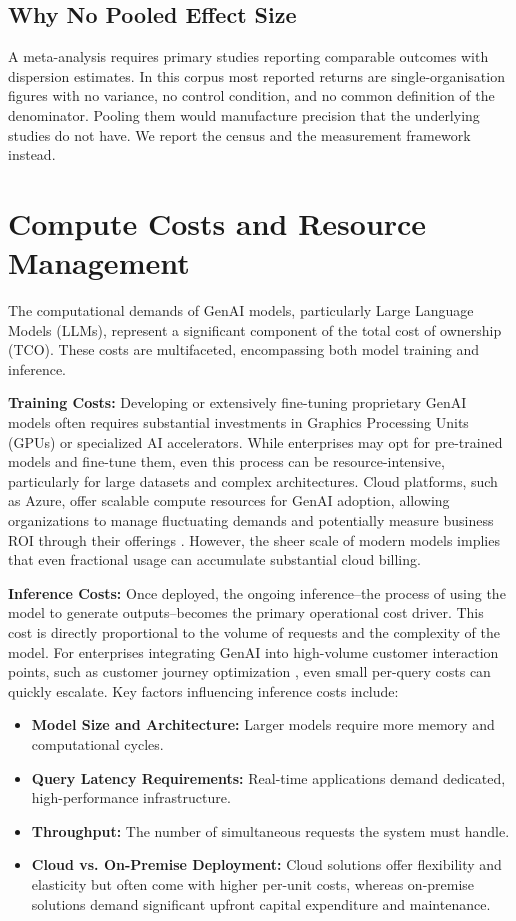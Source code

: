 \documentclass{article}
\begin{document}
\subsection{Why No Pooled Effect Size}


A meta-analysis requires primary studies reporting comparable outcomes with dispersion estimates. In this corpus most reported returns are single-organisation figures with no variance, no control condition, and no common definition of the denominator. Pooling them would manufacture precision that the underlying studies do not have. We report the census and the measurement framework instead.



\section{Compute Costs and Resource Management}


The computational demands of GenAI models, particularly Large Language Models (LLMs), represent a significant component of the total cost of ownership (TCO). These costs are multifaceted, encompassing both model training and inference.

\textbf{Training Costs:} Developing or extensively fine-tuning proprietary GenAI models often requires substantial investments in Graphics Processing Units (GPUs) or specialized AI accelerators. While enterprises may opt for pre-trained models and fine-tune them, even this process can be resource-intensive, particularly for large datasets and complex architectures. Cloud platforms, such as Azure, offer scalable compute resources for GenAI adoption, allowing organizations to manage fluctuating demands and potentially measure business ROI through their offerings \cite{openalex_w7138188291}. However, the sheer scale of modern models implies that even fractional usage can accumulate substantial cloud billing.

\textbf{Inference Costs:} Once deployed, the ongoing inference--the process of using the model to generate outputs--becomes the primary operational cost driver. This cost is directly proportional to the volume of requests and the complexity of the model. For enterprises integrating GenAI into high-volume customer interaction points, such as customer journey optimization \cite{openalex_w4400993506}, even small per-query costs can quickly escalate. Key factors influencing inference costs include:
\begin{itemize}
  \item \textbf{Model Size and Architecture:} Larger models require more memory and computational cycles.
  \item \textbf{Query Latency Requirements:} Real-time applications demand dedicated, high-performance infrastructure.
  \item \textbf{Throughput:} The number of simultaneous requests the system must handle.
  \item \textbf{Cloud vs. On-Premise Deployment:} Cloud solutions offer flexibility and elasticity but often come with higher per-unit costs, whereas on-premise solutions demand significant upfront capital expenditure and maintenance.
\end{itemize}
\end{document}

